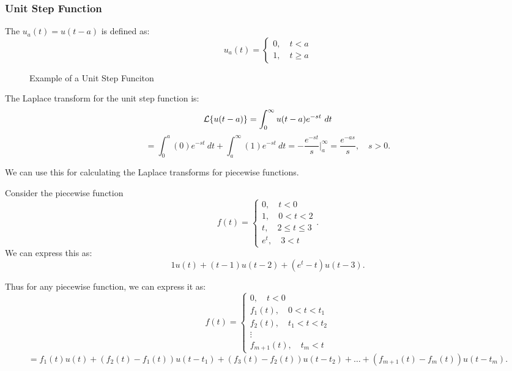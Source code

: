 \documentclass[../main/main.tex]{subfiles}
\begin{document}
\subsubsection{Unit Step Function}
\begin{definition}
	The  $u_a(t)=u(t-a)$ is defined as: \[
		u_a(t) = \begin{cases}
			0,\quad t<a\\
			1,\quad t\ge a
		\end{cases}
	\] 
\end{definition}
\begin{figure}[h!]
	\centering
	\caption{ Example of a Unit Step Funciton}
	\label{fig:}
\end{figure}	
\noindent The Laplace transform for the unit step function is: \[
	\mathcal{L} \{u(t-a)\} =\int^\infty_0 u(t-a)e^{-st}~dt
\] \[
= \int^a_0(0)e^{-st}~dt + \int^\infty_a (1) e^{-st}~dt = - \frac{e^{-st}}{s}\bigg\rvert^\infty_a = \frac{e^{-as}}{s},\quad s>0
.\] 
\begin{remark}
	We can use this for calculating the Laplace transforms for piecewise functions.
\end{remark}
\begin{example}\label{piece}
	Consider the piecewise function\[
		f(t) = \begin{cases}
			0,\quad t<0\\
			1, \quad 0<t<2\\
			t,\quad2\le t\le 3\\
			e^{t},\quad3<t
		\end{cases}
	.\] We can express this as: \[
	1u(t) + (t-1) u(t-2)+(e^{t}-t)u(t-3)
	.\] 
\end{example}


Thus for any piecewise function, we can express it as: \[
	f(t) = \begin{cases}
		0,\quad t<0\\
		f_1(t), \quad 0<t<t_1\\
		f_2(t), \quad t_1<t < t_2 \\
		\vdots\\
		f_{m+1}(t),\quad t_m<t
	\end{cases}\]\[= f_1(t)u(t)+(f_2(t)-f_1(t))u(t-t_1) + (f_3(t)-f_2(t))u(t-t_2) +\ldots + (f_{m+1}(t)-f_{m}(t))u(t-t_m)
.\] 
\end{document}
